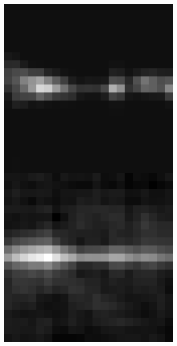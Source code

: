 \documentclass[10pt, letter]{article}
\begin{document}
\begin{figure}[h!]
\begin{subfigure}[t]{0.18\textwidth}
					\centering
					\includegraphics[width=\textwidth]{figures/inv3}
				\end{subfigure}	
				~
				\begin{subfigure}[t]{0.18\textwidth}
					\centering

\end{subfigure}
\end{figure}
\end{document}
